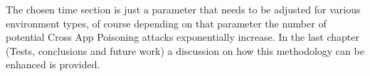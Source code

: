 The chosen time section is just a parameter that needs to be adjusted for various environment types, of course depending on that parameter the number of potential Cross App Poisoning attacks exponentially increase. In the last chapter (Tests, conclusions and future work) a discussion on how this methodology can be enhanced is provided.

\clearpage